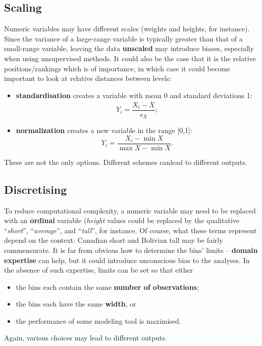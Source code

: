 \subsection{Scaling} Numeric variables may have different scales (weights and heights, for instance). Since the variance of a large-range variable is typically greater than that of a small-range variable, leaving the data \textbf{unscaled} may introduce biases, especially when using unsupervised methods. It could also be the case that it is the relative positions/rankings which is of importance, in which case it could become important to look at relative distances between levels: 
\begin{itemize}[noitemsep]
\item \textbf{standardisation} creates a variable with mean 0 and standard deviations 1: $$Y_i=\frac{X_i-\overline{X}}{s_X};$$
\item \textbf{normalization} creates a new variable in the range [0,1]: $$Y_i=\frac{X_i-\min {X}}{\max X- \min X}.$$
\end{itemize}
These are not the only options. Different schemes canlead to different outputs. 
\subsection{Discretising} To reduce computational complexity, a numeric variable may need to be replaced with an \textbf{ordinal} variable (\textit{height} values could be replaced by the qualitative ``\textit{short}'', ``\textit{average}'', and ``\textit{tall}'', for instance. Of course, what these terms represent depend on the context: Canadian short and Bolivian tall may be fairly commensurate.  It is far from obvious how to  determine the bins' limits  -- \textbf{domain expertise} can help, but it could introduce unconscious bias to the analyses. In the absence of such expertise, limits can be set so that either
\begin{itemize}[noitemsep]
\item the bins each contain the same \textbf{number of observations};
\item the bins each have the same \textbf{width}, or 
\item the performance of some modeling tool is maximised. 
\end{itemize}
Again, various choices may lead to different outputs. 
